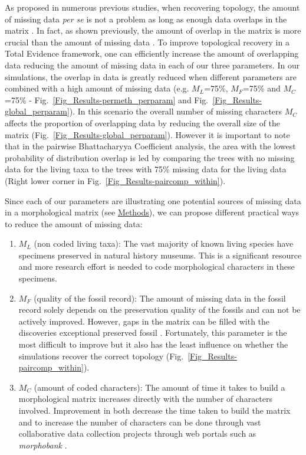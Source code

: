 \documentclass[12pt,letterpaper]{article}
\begin{document}
As proposed in numerous previous studies, when recovering topology, the amount of missing data \textit{per se} is not a problem as long as enough data overlaps in the matrix \citep[e.g.][]{kearneyfragmentary2002,wiensmissing2003,rouresite-specific2011,pattinsonphylogeny2014}. In fact, as shown previously, the amount of overlap in the matrix is more crucial than the amount of missing data \citep[e.g.][]{rouresite-specific2011}.
To improve topological recovery in a Total Evidence framework, one can efficiently increase the amount of overlapping data reducing the amount of missing data in each of our three parameters. In our simulations, the overlap in data is greatly reduced when different parameters are combined with a high amount of missing data (e.g. $M_{L}$=75\%, $M_{F}$=75\% and $M_{C}$=75\% - Fig.~\ref{Fig_Results-permeth_perparam} and Fig.~\ref{Fig_Results-global_perparam}). In this scenario the overall number of missing characters $M_{C}$ affects the proportion of overlapping data by reducing the overall size of the matrix (Fig.~\ref{Fig_Results-global_perparam}). However it is important to note that in the pairwise Bhattacharyya Coefficient analysis, the area with the lowest probability of distribution overlap is led by comparing the trees with no missing data for the living taxa to the trees with 75\% missing data for the living data (Right lower corner in Fig.~\ref{Fig_Results-paircomp_within}).

Since each of our parameters are illustrating one potential sources of missing data in a morphological matrix (see \hyperref[Removing_data]{Methods}), we can propose different practical ways to reduce the amount of missing data:
\begin{enumerate}
\item{$M_{L}$ (non coded living taxa):}
The vast majority of known living species have specimens preserved in natural history museums. This is a significant resource and more research effort is needed to code morphological characters in these specimens.
\item{$M_{F}$ (quality of the fossil record):}
The amount of missing data in the fossil record solely depends on the preservation quality of the fossils and can not be actively improved. However, gaps in the matrix can be filled with the discoveries exceptional preserved fossil \citep[e.g.][]{nithe2013}. Fortunately, this parameter is the most difficult to improve but it also has the least influence on whether the simulations recover the correct topology (Fig.~\ref{Fig_Results-paircomp_within}).
\item{$M_{C}$ (amount of coded characters):}
The amount of time it takes to build a morphological matrix increases directly with the number of characters involved. Improvement in both decrease the time taken to build the matrix and to increase the number of characters can be done through vast collaborative data collection projects through web portals such as \textit{morphobank} \citep{morphobank}.
\end{enumerate}
\end{document}

